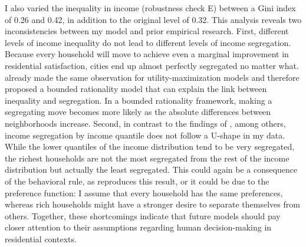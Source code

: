 I also varied the inequality in income (robustness check E) between a Gini index of 0.26 and 0.42, in addition to the original level of 0.32. This analysis reveals two inconsistencies between my model and prior empirical research. First, different levels of income inequality do not lead to different levels of income segregation. Because every household will move to achieve even a marginal improvement in residential satisfaction, cities end up almost perfectly segregated no matter what. \citet{yavasDissectingIncomeSegregation2019} already made the same observation for utility-maximization models and therefore proposed a bounded rationality model that can explain the link between inequality and segregation. In a bounded rationality framework, making a segregating move becomes more likely as the absolute differences between neighborhoods increase. Second, in contrast to the findings of \citet{reardonIncomeInequalityIncome2011}, among others, income segregation by income quantile does not follow a U-shape in my data. While the lower quantiles of the income distribution tend to be very segregated, the richest households are not the most segregated from the rest of the income distribution but actually the least segregated. This could again be a consequence of the behavioral rule, as \citet{yavasDissectingIncomeSegregation2019} reproduces this result, or it could be due to the preference function: I assume that every household has the same preferences, whereas rich households might have a stronger desire to separate themselves from others. Together, these shortcomings indicate that future models should pay closer attention to their assumptions regarding human decision-making in residential contexts.
